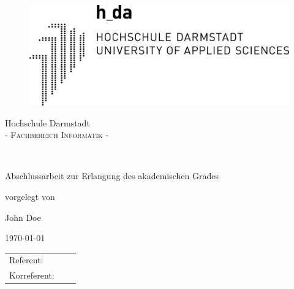 \begin{titlepage}


\begin{figure}[t]
	\centering
	\begin{minipage}[t]{0.6\textwidth}
		{\setlength\fboxrule{0pt} \includegraphics{res/Hda_logo}}
	\end{minipage}
\end{figure}


\begin{center}
	
	\LARGE Hochschule Darmstadt \\%
	\Large \textsc{- Fachbereich Informatik -}\\ %
	
	\vspace{60 pt}
	
	\LARGE \ttitle\\
	\vspace{20 pt}
	
	\large
	Abschlussarbeit zur Erlangung des akademischen Grades \degreename
		
	vorgelegt von\\
	\vspace{8 pt}
	\begin{center}
		\huge
		John Doe\\ %
	\end{center}
	
	\today

	
	\vspace*{\fill}%
	\vfill
	
	\begin{tabular}[h]{p{4cm}l l}
		Referent: & \supname\\
		Korreferent: & \examname\\
	\end{tabular}
	

	
\end{center}
\end{titlepage}